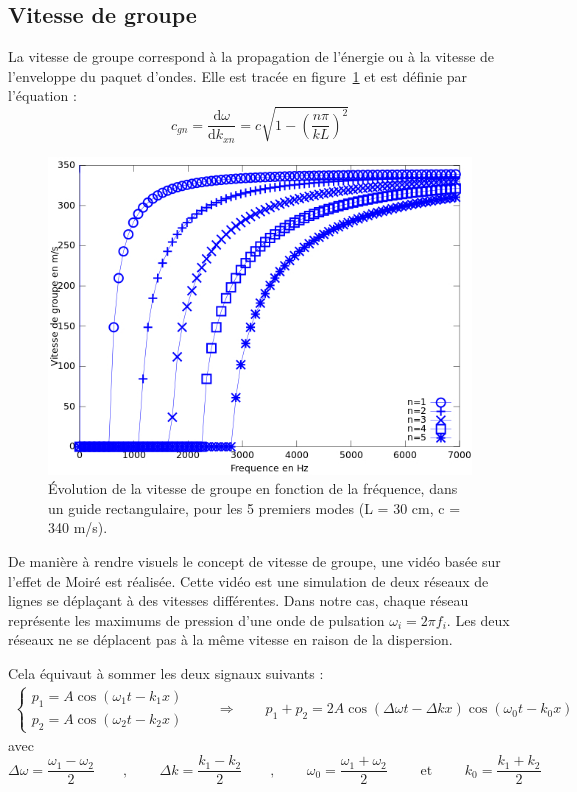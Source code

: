\documentclass[a4paper,11pt]{report} %
\begin{document}
\subsection{Vitesse de groupe}

La vitesse de groupe correspond à la propagation de l'énergie ou à la vitesse de l'enveloppe du paquet d'ondes. Elle est tracée en figure~\ref{graph_c_groupe} et est définie par l'équation : 
\begin{equation}
c_{gn} = \frac{\mathrm{d}\omega}{\mathrm{d}k_{xn}} = c\sqrt{1-\left(\frac{n\pi}{kL}\right)^{2}}
\end{equation}

\begin{figure}[h!]
\centering \includegraphics[scale = 0.6]{./figures/c_groupe.jpg}
\caption{Évolution de la vitesse de groupe en fonction de la fréquence, dans un guide rectangulaire, pour les 5 premiers modes (L = 30 cm, c = 340 m/s).} \label{graph_c_groupe}
\end{figure}


\bigskip
De manière à rendre visuels le concept de vitesse de groupe, une vidéo basée sur l'effet de Moiré est réalisée. Cette vidéo est une simulation de deux réseaux de lignes se déplaçant à des vitesses différentes.
Dans notre cas, chaque réseau représente les maximums de pression d'une onde de pulsation $\omega_i = 2\pi f_i$. Les deux réseaux ne se déplacent pas à la même vitesse en raison de la dispersion.

Cela équivaut à sommer les deux signaux suivants : 
\begin{eqnarray}
	\begin{cases}
		p_1 = A\cos(\omega_1t-k_1x) \\
		p_2 = A\cos(\omega_2t-k_2x)
	\end{cases} 
	\qquad \Rightarrow \qquad p_1+p_2 =2A\cos\left(\Delta \omega t-\Delta kx\right)\cos\left(\omega_0 t-k_0x\right)
\end{eqnarray}
avec
\begin{equation*}
\Delta \omega = \frac{\omega_1-\omega_2}{2} \qquad \text{,~} \qquad \Delta k = \frac{k_1-k_2}{2} \qquad \text{,~} \qquad  \omega_0 = \frac{\omega_1+\omega_2}{2} \qquad \text{ et } \qquad  k_0 = \frac{k_1+k_2}{2}
\end{equation*}
\end{document}
